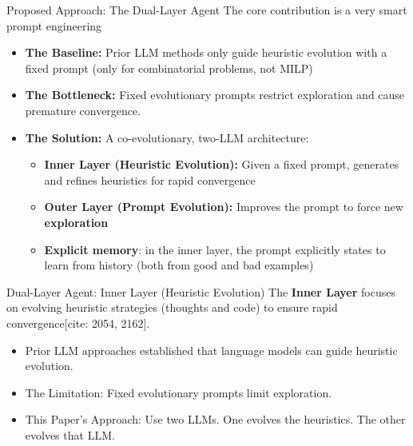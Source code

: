 \documentclass{beamer}
\begin{document}
\begin{frame}{Proposed Approach: The Dual-Layer Agent}
The core contribution is   a very smart prompt engineering
    \begin{itemize}
        \item \textbf{The Baseline:} Prior LLM methods only guide heuristic evolution  with a fixed prompt (only for combinatorial problems, not MILP)
        
        \vspace{0.2cm} %
        
        \item \textbf{The Bottleneck:} Fixed evolutionary prompts restrict exploration and cause premature convergence.
        
        \vspace{0.2cm}
        
        \item \textbf{The Solution:} A co-evolutionary, two-LLM architecture:
        \begin{itemize}
            \item \textbf{Inner Layer (Heuristic Evolution):} Given a fixed prompt, generates and refines heuristics for rapid convergence
            \item \textbf{Outer Layer (Prompt Evolution):} Improves the prompt  to  force new \textbf{exploration}
            \item \textbf{Explicit memory}: in the inner layer, the prompt explicitly states to learn from history (both from good and bad examples)
        \end{itemize}
    \end{itemize}
\end{frame}
	
	\begin{frame}{Dual-Layer Agent: Inner Layer (Heuristic Evolution)}
		The \textbf{Inner Layer} focuses on evolving heuristic strategies (thoughts and code) to ensure rapid convergence[cite: 2054, 2162].
		
		\begin{itemize}
			\item Prior LLM approaches established that language models can guide heuristic evolution.
			\item The Limitation: Fixed evolutionary prompts limit exploration.
			\item This Paper's Approach: Use two LLMs. One evolves the heuristics. The other  evolves that LLM.

					\end{itemize}
	\end{frame}
	
\end{document}
